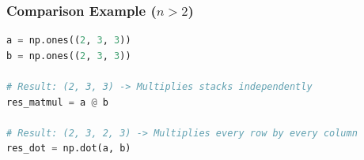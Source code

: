\subsubsection{Comparison Example ($n > 2$)}
\begin{lstlisting}[language=Python]
a = np.ones((2, 3, 3))
b = np.ones((2, 3, 3))

# Result: (2, 3, 3) -> Multiplies stacks independently
res_matmul = a @ b 

# Result: (2, 3, 2, 3) -> Multiplies every row by every column
res_dot = np.dot(a, b)     
\end{lstlisting}

